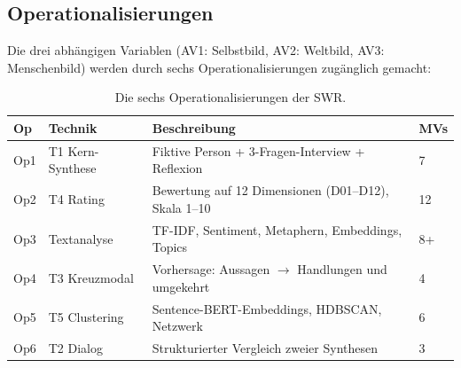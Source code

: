 \documentclass[12pt,a4paper]{article}
\begin{document}
\subsection{Operationalisierungen}
\label{sec:methodik:ops}

Die drei abh\"angigen Variablen (AV1: Selbstbild, AV2: Weltbild, AV3: Menschenbild) werden durch sechs Operationalisierungen zug\"anglich gemacht:

\begin{table}[htbp]
  \centering
  \caption{Die sechs Operationalisierungen der SWR.}
  \label{tab:ops}
  \small
  \begin{tabularx}{\textwidth}{l l X l}
    \toprule
    \textbf{Op} & \textbf{Technik} & \textbf{Beschreibung} & \textbf{MVs} \\
    \midrule
    Op1 & T1 Kern-Synthese & Fiktive Person + 3-Fragen-Interview + Reflexion & 7 \\
    Op2 & T4 Rating & Bewertung auf 12 Dimensionen (D01--D12), Skala 1--10 & 12 \\
    Op3 & Textanalyse & TF-IDF, Sentiment, Metaphern, Embeddings, Topics & 8+ \\
    Op4 & T3 Kreuzmodal & Vorhersage: Aussagen $\to$ Handlungen und umgekehrt & 4 \\
    Op5 & T5 Clustering & Sentence-BERT-Embeddings, HDBSCAN, Netzwerk & 6 \\
    Op6 & T2 Dialog & Strukturierter Vergleich zweier Synthesen & 3 \\
    \bottomrule
  \end{tabularx}
\end{table}
\end{document}
